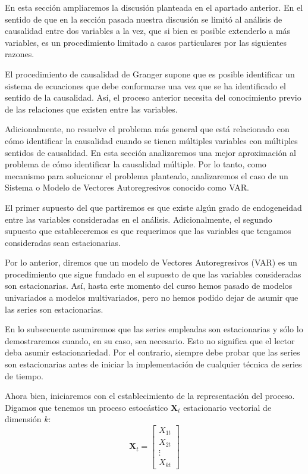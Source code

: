 \documentclass[
]{book}
\begin{document}
En esta sección ampliaremos la discusión planteada en el apartado anterior. En el sentido de que en la sección pasada nuestra discusión se limitó al análisis de causalidad entre dos variables a la vez, que si bien es posible extenderlo a más variables, es un procedimiento limitado a casos particulares por las siguientes razones.

El procedimiento de causalidad de Granger supone que es posible identificar un sistema de ecuaciones que debe conformarse una vez que se ha identificado el sentido de la causalidad. Así, el proceso anterior necesita del conocimiento previo de las relaciones que existen entre las variables.

Adicionalmente, no resuelve el problema más general que está relacionado con cómo identificar la causalidad cuando se tienen múltiples variables con múltiples sentidos de causalidad. En esta sección analizaremos una mejor aproximación al problema de cómo identificar la causalidad múltiple. Por lo tanto, como mecanismo para solucionar el problema planteado, analizaremos el caso de un Sistema o Modelo de Vectores Autoregresivos conocido como VAR.

El primer supuesto del que partiremos es que existe algún grado de endogeneidad entre las variables consideradas en el análisis. Adicionalmente, el segundo supuesto que estableceremos es que requerimos que las variables que tengamos consideradas sean estacionarias.

Por lo anterior, diremos que un modelo de Vectores Autoregresivos (VAR) es un procedimiento que sigue fundado en el supuesto de que las variables consideradas son estacionarias. Así, hasta este momento del curso hemos pasado de modelos univariados a modelos multivariados, pero no hemos podido dejar de asumir que las series son estacionarias.

En lo subsecuente asumiremos que las series empleadas son estacionarias y sólo lo demostraremos cuando, en su caso, sea necesario. Esto no significa que el lector deba asumir estacionariedad. Por el contrario, siempre debe probar que las series son estacionarias antes de iniciar la implementación de cualquier técnica de series de tiempo.

Ahora bien, iniciaremos con el establecimiento de la representación del proceso. Digamos que tenemos un proceso estocástico \(\mathbf{X}_t\) estacionario vectorial de dimensión \(k\):
\begin{equation*}
    \mathbf{X}_t = 
    \begin{bmatrix}
    X_{1t} \\ X_{2t} \\ \vdots \\ X_{kt}
    \end{bmatrix}
\end{equation*}
\end{document}
